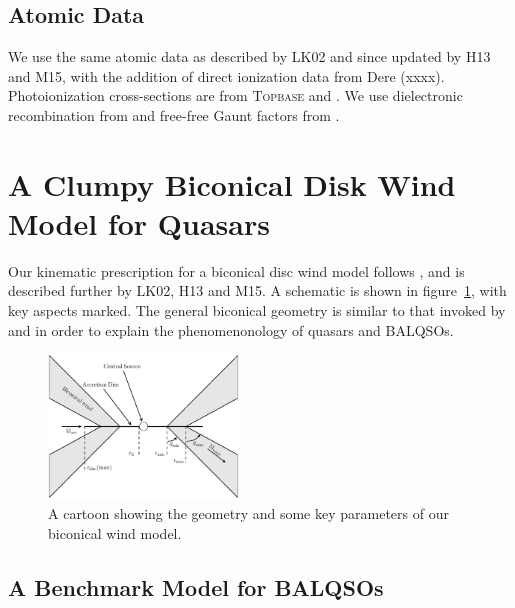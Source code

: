 \documentclass[useAMS,usenatbib]{mn2e_x}
\begin{document}
\subsection{Atomic Data}

We use the same atomic data as described by LK02 and since
updated by H13 and M15, with the addition of direct ionization data from Dere (xxxx). 
Photoionization cross-sections are from \textsc{Topbase} \citep{cunto1993} and  \cite{vfky}.
We use dielectronic recombination from \cite{badnell2006} and free-free 
Gaunt factors from \cite{sutherland1998}.






\section{A Clumpy Biconical Disk Wind Model for Quasars}

Our kinematic prescription for a biconical disc wind model
follows \cite{SV93}, and is described further by
LK02, H13 and M15. A schematic is shown in figure~\ref{fig:cartoon},
with key aspects marked. The general biconical
geometry is similar to that invoked by \cite{MCGV95} and 
\cite{elvis2000} in order to explain the phenomenonology
of quasars and BALQSOs.


\begin{figure} 
\centering
\includegraphics[width=0.45\textwidth]{figures/fig2_cartoon.eps}
\caption
{
A cartoon showing the geometry and some key parameters of
our biconical wind model.
}
\label{fig:cartoon}
\end{figure} 



\subsection{A Benchmark Model for BALQSOs}
\end{document}
